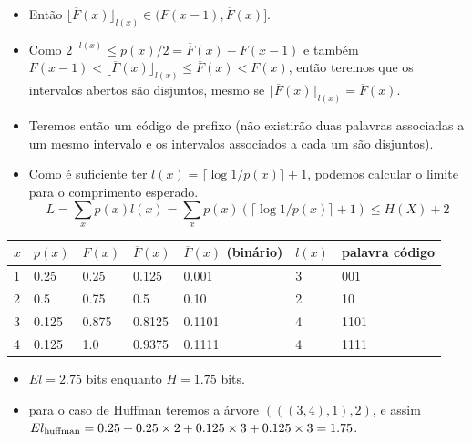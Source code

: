 \begin{frame}[allowframebreaks]
\begin{itemize}
  \item Então $\lfloor \overline{F}(x) \rfloor_{l(x)} \in (F(x-1), \overline{F}(x)]$.
  \item Como $2^{-l(x)} \leq p(x)/2 = \overline{F}(x) - F(x-1)$  e também $F(x-1) < \lfloor \overline{F}(x) \rfloor_{l(x)} \leq \overline{F}(x) < F(x)$, então
	teremos que os intervalos abertos são disjuntos, mesmo se $\lfloor \overline{F}(x) \rfloor_{l(x)} = \overline{F}(x)$.
  \item Teremos então um código de prefixo (não existirão duas palavras associadas a um mesmo intervalo e os intervalos associados a cada um são disjuntos).
  \item Como é suficiente ter $l(x) = \lceil \log 1/p(x) \rceil + 1$, podemos calcular o limite para o comprimento esperado.
	\begin{equation}
	L = \sum_{x} p(x) l(x) = \sum_{x} p(x) (\lceil \log 1 / p(x) \rceil + 1) \leq H(X) + 2
	\end{equation}
  \end{itemize}

  \framebreak

  \begin{example}
 	\begin{tabular}{lllllll}
	$x$ & $p(x)$ & $F(x)$ & $\overline{F}(x)$ 	& $\overline{F}(x)$ (binário) & $l(x)$ & palavra código \\ \hline
	1   & 0.25   & 0.25   & 0.125 		& 0.001			& 3	& 001 	\\
	2   & 0.5    & 0.75   & 0.5		& 0.10			& 2	& 10	\\
	3   & 0.125  & 0.875  & 0.8125		& 0.1101		& 4	& 1101	\\
	4   & 0.125  & 1.0    & 0.9375 		& 0.1111		& 4	& 1111
	\end{tabular}
  	\begin{itemize}
	\item $El = 2.75$ bits enquanto $H=1.75$ bits.
	\item para o caso de Huffman teremos a árvore $(((3,4),1),2)$, e assim $El_{\text{huffman}} = 0.25 \time 1 + 0.25 \times 2 + 0.125 \times 3 + 0.125 \times 3 = 1.75$.
	\end{itemize}
  \end{example}

  \framebreak 


\end{frame}
